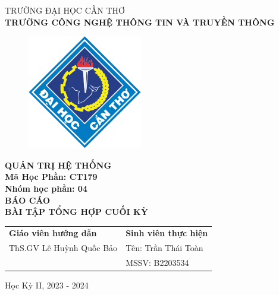 \begin{titlepage}
  \begin{center}
    \vspace{-6pt}TRƯỜNG ĐẠI HỌC CẦN THƠ \\
    \textbf{\fontsize{16pt}{0pt}\selectfont TRƯỜNG CÔNG NGHỆ THÔNG TIN VÀ TRUYỀN THÔNG}
    \begin{figure}[H]
      \centering
      \includegraphics[width=5cm]{imgs/logo-ctu.png}
    \end{figure}
    \textbf{QUẢN TRỊ HỆ THỐNG} \\
    \textbf{Mã Học Phần: CT179} \\
    \textbf{Nhóm học phần: 04} \\
    \vspace{3.5cm}
    \textbf{\fontsize{16pt}{0pt}\selectfont BÁO CÁO} \\
    \textbf{\fontsize{18pt}{0pt}\selectfont BÀI TẬP TỔNG HỢP CUỐI KỲ} \\
    \vspace{4.5cm}
    \newcommand{\MyIndent}{\hspace{1cm}}
    \begin{tabular}{p{8cm} l}
      \textbf{Giáo viên hướng dẫn}       & \textbf{Sinh viên thực hiện}  \\
      \MyIndent ThS.GV Lê Huỳnh Quốc Bảo & \MyIndent Tên: Trần Thái Toàn \\
                                         & \MyIndent MSSV: B2203534
    \end{tabular}


    \vspace{2cm}
    \fontsize{14pt}{0pt}\selectfont Học Kỳ II, 2023 - 2024
  \end{center}
\end{titlepage}
\cleardoublepage
